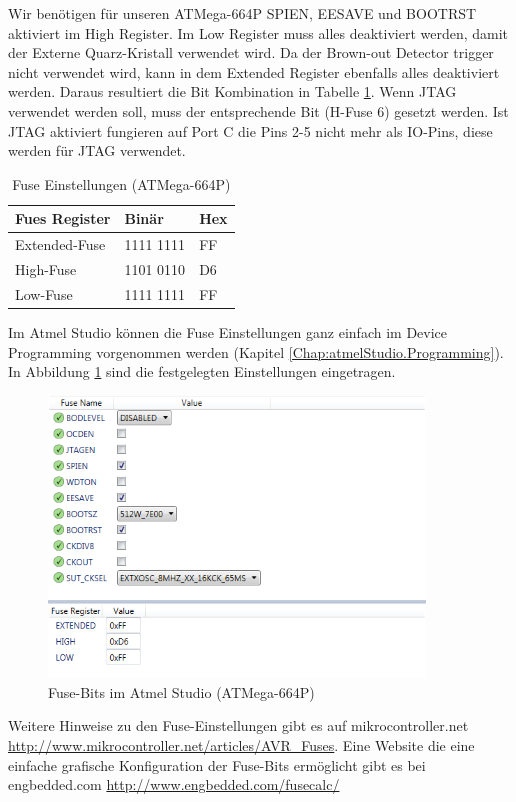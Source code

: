 Wir benötigen für unseren ATMega-664P SPIEN, EESAVE und BOOTRST aktiviert im
High Register. Im Low Register muss alles deaktiviert werden, damit der Externe
Quarz-Kristall verwendet wird. Da der Brown-out Detector trigger nicht
verwendet wird, kann in dem Extended Register ebenfalls alles deaktiviert
werden. Daraus resultiert die Bit Kombination in Tabelle \ref{fuses-result}.
Wenn \ac{JTAG} verwendet werden soll, muss der entsprechende Bit (H-Fuse 6)
gesetzt werden. Ist \ac{JTAG} aktiviert fungieren auf Port C die Pins 2-5
nicht mehr als IO-Pins, diese werden für \ac{JTAG} verwendet.

\begin{table}[H]
\centering
\begin{tabular}{|l|l|l|} \hline
Fues Register & Binär & Hex\\ \hline
Extended-Fuse & 1111 1111 & FF\\ \hline
High-Fuse & 1101 0110 & D6\\ \hline
Low-Fuse & 1111 1111 & FF\\ \hline
\end{tabular}
\caption{Fuse Einstellungen (ATMega-664P)}
\label{fuses-result}
\end{table}

Im Atmel Studio können die Fuse Einstellungen ganz einfach im Device Programming
vorgenommen werden (Kapitel \ref{Chap:atmelStudio.Programming}). In Abbildung
\ref{fuses-graf} sind die festgelegten Einstellungen eingetragen.

\begin{figure}[H]
\centering
\includegraphics[width=10cm]{content/pictures/Fusebits/fusebits_atmelstudio.png}
\caption{Fuse-Bits im Atmel Studio (ATMega-664P)}
\label{fuses-graf}
\end{figure}

Weitere Hinweise zu den Fuse-Einstellungen gibt es auf mikrocontroller.net
\url{http://www.mikrocontroller.net/articles/AVR_Fuses}.
Eine Website die eine einfache grafische Konfiguration der Fuse-Bits ermöglicht
gibt es bei engbedded.com \url{http://www.engbedded.com/fusecalc/}

